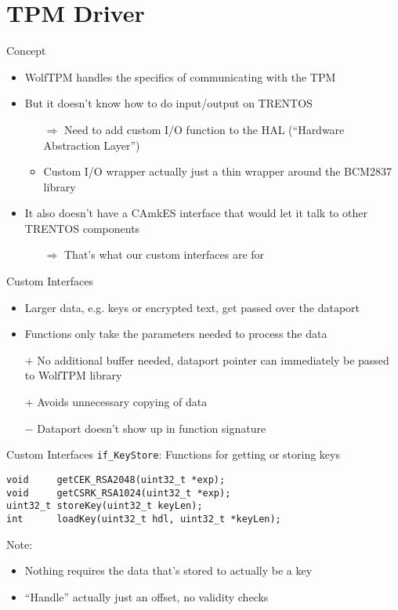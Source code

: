 \section{TPM Driver}

\begin{frame}{Concept}
\begin{itemize}
\item WolfTPM handles the specifics of communicating with the TPM
\item But it doesn't know how to do input/output on TRENTOS
  \begin{itemize}
  \item[$\Rightarrow$] Need to add custom I/O function to the HAL (``Hardware Abstraction Layer'')
  \item Custom I/O wrapper actually just a thin wrapper around the BCM2837 library
  \end{itemize}
\item It also doesn't have a CAmkES interface that would let it talk to other TRENTOS components
  \begin{itemize}
  \item[$\Rightarrow$] That's what our custom interfaces are for
  \end{itemize}
\end{itemize}
\end{frame}

\begin{frame}{Custom Interfaces}
\begin{itemize}
\item Larger data, e.g. keys or encrypted text, get passed over the dataport
\item Functions only take the parameters needed to process the data
\item[$+$] No additional buffer needed, dataport pointer can immediately be passed to WolfTPM library \\
\item[$+$] Avoids unnecessary copying of data
\item[$-$] Dataport doesn't show up in function signature
\end{itemize}
\end{frame}

\begin{frame}[fragile]{Custom Interfaces}
\texttt{if\_KeyStore}: Functions for getting or storing keys

\begin{verbatim}
void     getCEK_RSA2048(uint32_t *exp);
void     getCSRK_RSA1024(uint32_t *exp);
uint32_t storeKey(uint32_t keyLen);
int      loadKey(uint32_t hdl, uint32_t *keyLen);
\end{verbatim}

Note:
\begin{itemize}
\item Nothing requires the data that's stored to actually be a key
\item ``Handle'' actually just an offset, no validity checks
\end{itemize}
\end{frame}


